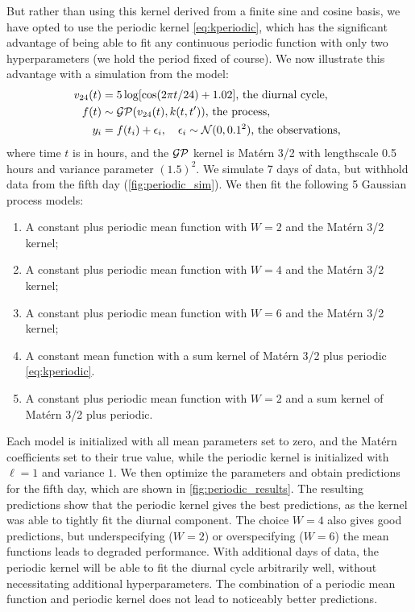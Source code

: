 But rather than using this kernel derived from a finite sine and cosine basis,
we have opted to use the periodic kernel \autoref{eq:kperiodic},
which has the significant advantage of being able to fit any continuous periodic function
with only two hyperparameters (we hold the period fixed of course).
We now illustrate this advantage with a simulation from the model:
\begin{equation}
\begin{split}
    v_{24}(t) &= 5 \log\sbr{ \cos(2\pi t / 24) + 1.02} \text{, the diurnal cycle,}\\
    f(t) & \sim \GP(v_{24}(t), k(t,t')) \text{, the process,}\\
    y_i &= f(t_i) + \epsilon_i, \quad \epsilon_i \sim \normal(0, 0.1^2) \text{, the observations, }
\end{split}
\end{equation}
where time $t$ is in hours, and the $\operatorname{\mathcal{GP}}$ kernel is Mat\'ern 3/2 with lengthscale 0.5 hours and variance parameter $(1.5)^2$.
We simulate 7 days of data, but withhold data from the fifth day (\autoref{fig:periodic_sim}).
We then fit the following 5 Gaussian process models:
\begin{enumerate}
    \item A constant plus periodic mean function with $W=2$ and the Mat\'ern 3/2  kernel;
    \item A constant plus periodic mean function with $W=4$ and the Mat\'ern 3/2  kernel;
    \item A constant plus periodic mean function with $W=6$ and the Mat\'ern 3/2  kernel;
    \item A constant mean function with a sum kernel of Mat\'ern 3/2 plus periodic \autoref{eq:kperiodic}.
    \item A constant plus periodic mean function with $W=2$ and a sum kernel of Mat\'ern 3/2 plus periodic.
\end{enumerate}
Each model is initialized with all mean parameters set to zero, and the Mat\'ern coefficients set to their true value,
while the periodic kernel is initialized with $\ell=1$ and variance $1$.
We then optimize the parameters and obtain predictions for the fifth day, which are shown in \autoref{fig:periodic_results}.
The resulting predictions show that the periodic kernel gives the best predictions, as the kernel was able to tightly fit the diurnal component.
The choice $W=4$ also gives good predictions, but underspecifying ($W=2$) or overspecifying ($W=6$) the mean functions leads to degraded performance.
With additional days of data, the periodic kernel will be able to fit the diurnal cycle arbitrarily well,
without necessitating additional hyperparameters.
The combination of a periodic mean function and periodic kernel does not lead to noticeably better predictions.

